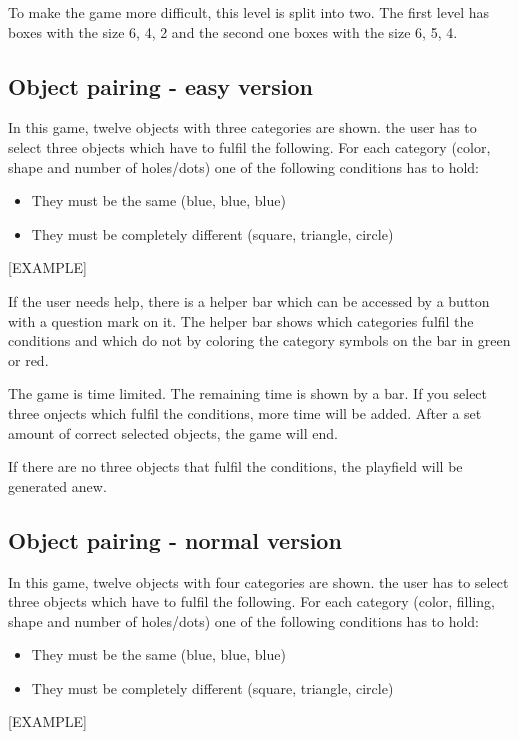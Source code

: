 To make the game more difficult, this level is split into two.
The first level has boxes with the size 6, 4, 2 and the second one boxes with the size 6, 5, 4.

\subsection{Object pairing - easy version}\label{subsec:object-pairing---easy-version}
In this game, twelve objects with three categories are shown.
the user has to select three objects which have to fulfil the following.
For each category (color, shape and number of holes/dots) one of the following conditions has to hold:
\begin{itemize}
    \item They must be the same (blue, blue, blue)
    \item They must be completely different (square, triangle, circle)
\end{itemize}
[EXAMPLE]

If the user needs help, there is a helper bar which can be accessed by a button with a question mark on it.
The helper bar shows which categories fulfil the conditions and which do not
by coloring the category symbols on the bar in green or red.

The game is time limited. The remaining time is shown by a bar.
If you select three onjects which fulfil the conditions, more time will be added.
After a set amount of correct selected objects, the game will end.

If there are no three objects that fulfil the conditions, the playfield will be generated anew.

\subsection{Object pairing - normal version}\label{subsec:object-pairing---normal-version}
In this game, twelve objects with four categories are shown.
the user has to select three objects which have to fulfil the following.
For each category (color, filling, shape and number of holes/dots) one of the following conditions has to hold:
\begin{itemize}
    \item They must be the same (blue, blue, blue)
    \item They must be completely different (square, triangle, circle)
\end{itemize}

[EXAMPLE]

